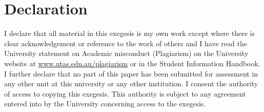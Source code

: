 \cleardoublepage{}
\section[Declaration]{Declaration}
 \noindent I declare that all material in this exegesis is my own work except where there is clear acknowledgement or reference to the work of others and I have read the University statement on Academic misconduct (Plagiarism) on the University website at
\url{www.utas.edu.au/plagiarism} or in the Student Information Handbook. I further declare that no part of this paper has been submitted for assessment in any other unit at this university or any other institution. I consent the authority of access to copying this exegesis. This authority is subject to any agreement entered into by the University concerning access to the exegesis. 

\author{}

\date{\today}

\thispagestyle{empty}
\cleardoublepage{}
